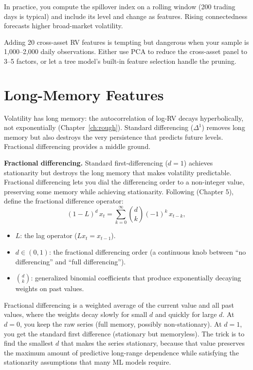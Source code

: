 In practice, you compute the spillover index on a rolling window (200 trading days is typical) and include its level and change as features.
Rising connectedness forecasts higher broad-market volatility.

\begin{warning}
Adding 20 cross-asset RV features is tempting but dangerous when your sample is 1,000--2,000 daily observations.
Either use PCA to reduce the cross-asset panel to 3--5 factors, or let a tree model's built-in feature selection handle the pruning.
\end{warning}

\section{Long-Memory Features}\label{sec:feat-longmem}

Volatility has long memory: the autocorrelation of log-RV decays hyperbolically, not exponentially (Chapter~\ref{ch:rough}).
Standard differencing ($\Delta^1$) removes long memory but also destroys the very persistence that predicts future levels.
Fractional differencing provides a middle ground.

\textbf{Fractional differencing.}
Standard first-differencing ($d=1$) achieves stationarity but destroys the long memory that makes volatility predictable. Fractional differencing lets you dial the differencing order to a non-integer value, preserving some memory while achieving stationarity. Following \citet{LopezdePrado2018AFML} (Chapter 5), define the fractional difference operator:
\begin{equation}\label{eq:frac-diff}
(1 - L)^d \, x_t = \sum_{k=0}^{\infty} \binom{d}{k} (-1)^k \, x_{t-k},
\end{equation}
\begin{itemize}[nosep]
  \item $L$: the lag operator ($Lx_t = x_{t-1}$).
  \item $d \in (0,1)$: the fractional differencing order (a continuous knob between ``no differencing'' and ``full differencing'').
  \item $\binom{d}{k}$: generalized binomial coefficients that produce exponentially decaying weights on past values.
\end{itemize}

\begin{intuition}
Fractional differencing is a weighted average of the current value and all past values, where the weights decay slowly for small $d$ and quickly for large $d$. At $d=0$, you keep the raw series (full memory, possibly non-stationary). At $d=1$, you get the standard first difference (stationary but memoryless). The trick is to find the smallest $d$ that makes the series stationary, because that value preserves the maximum amount of predictive long-range dependence while satisfying the stationarity assumptions that many ML models require.
\end{intuition}

